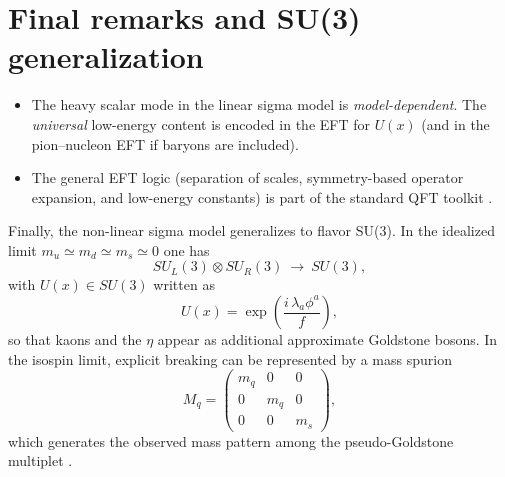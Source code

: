 \section{Final remarks and SU(3) generalization}

\begin{itemize}
  \item The heavy scalar mode in the linear sigma model is \emph{model-dependent}.
  The \emph{universal} low-energy content is encoded in the EFT for $U(x)$
  (and in the pion--nucleon EFT if baryons are included).
  \item The general EFT logic (separation of scales, symmetry-based operator expansion,
  and low-energy constants) is part of the standard QFT toolkit
  \citep{peskin1995,schwartz2014,weinberg1995qtf1}.
\end{itemize}

Finally, the non-linear sigma model generalizes to flavor SU(3). In the idealized limit
$m_u\simeq m_d\simeq m_s\simeq 0$ one has
\begin{equation}
SU_L(3)\otimes SU_R(3)\ \longrightarrow\ SU(3),
\end{equation}
with $U(x)\in SU(3)$ written as
\begin{equation}
U(x)=\exp\!\left(\frac{i\,\lambda_a \phi^a}{f}\right),
\end{equation}
so that kaons and the $\eta$ appear as additional approximate Goldstone bosons.
In the isospin limit, explicit breaking can be represented by a mass spurion
\begin{equation}
M_q=
\begin{pmatrix}
m_q & 0 & 0\\
0 & m_q & 0\\
0 & 0 & m_s
\end{pmatrix},
\end{equation}
which generates the observed mass pattern among the pseudo-Goldstone multiplet
\citep{thomson2013,donoghue1992}.
